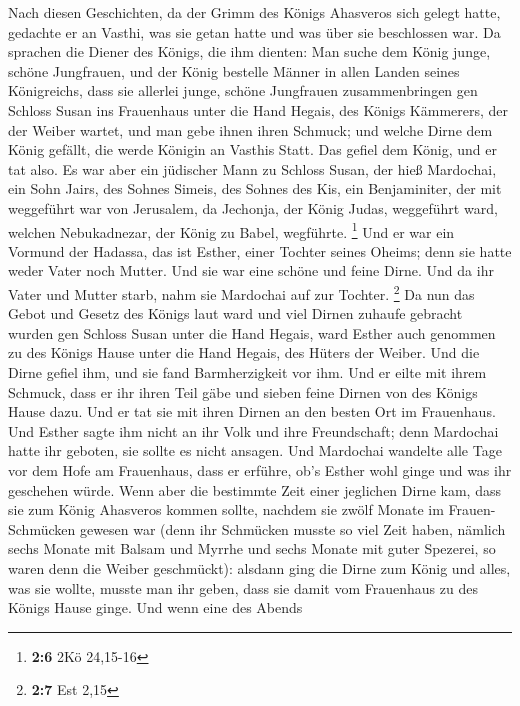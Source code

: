  Nach diesen Geschichten, da der Grimm des Königs
Ahasveros sich gelegt hatte, gedachte er an Vasthi, was sie getan hatte
und was über sie beschlossen war.  Da sprachen die Diener
des Königs, die ihm dienten: Man suche dem König junge, schöne
Jungfrauen,  und der König bestelle Männer in allen Landen
seines Königreichs, dass sie allerlei junge, schöne Jungfrauen
zusammenbringen gen Schloss Susan ins Frauenhaus unter die Hand Hegais,
des Königs Kämmerers, der der Weiber wartet, und man gebe ihnen ihren
Schmuck;  und welche Dirne dem König gefällt, die werde
Königin an Vasthis Statt. Das gefiel dem König, und er tat also.
 Es war aber ein jüdischer Mann zu Schloss Susan, der hieß
Mardochai, ein Sohn Jairs, des Sohnes Simeis, des Sohnes des Kis, ein
Benjaminiter,  der mit weggeführt war von Jerusalem, da
Jechonja, der König Judas, weggeführt ward, welchen Nebukadnezar, der
König zu Babel, wegführte. \footnote{\textbf{2:6} 2Kö 24,15-16}
 Und er war ein Vormund der Hadassa, das ist Esther, einer
Tochter seines Oheims; denn sie hatte weder Vater noch Mutter. Und sie
war eine schöne und feine Dirne. Und da ihr Vater und Mutter starb, nahm
sie Mardochai auf zur Tochter. \footnote{\textbf{2:7} Est 2,15}
 Da nun das Gebot und Gesetz des Königs laut ward und viel
Dirnen zuhaufe gebracht wurden gen Schloss Susan unter die Hand Hegais,
ward Esther auch genommen zu des Königs Hause unter die Hand Hegais, des
Hüters der Weiber.  Und die Dirne gefiel ihm, und sie fand
Barmherzigkeit vor ihm. Und er eilte mit ihrem Schmuck, dass er ihr
ihren Teil gäbe und sieben feine Dirnen von des Königs Hause dazu. Und
er tat sie mit ihren Dirnen an den besten Ort im Frauenhaus.
 Und Esther sagte ihm nicht an ihr Volk und ihre
Freundschaft; denn Mardochai hatte ihr geboten, sie sollte es nicht
ansagen.  Und Mardochai wandelte alle Tage vor dem Hofe
am Frauenhaus, dass er erführe, ob's Esther wohl ginge und was ihr
geschehen würde.  Wenn aber die bestimmte Zeit einer
jeglichen Dirne kam, dass sie zum König Ahasveros kommen sollte, nachdem
sie zwölf Monate im Frauen-Schmücken gewesen war (denn ihr Schmücken
musste so viel Zeit haben, nämlich sechs Monate mit Balsam und Myrrhe
und sechs Monate mit guter Spezerei, so waren denn die Weiber
geschmückt):  alsdann ging die Dirne zum König und alles,
was sie wollte, musste man ihr geben, dass sie damit vom Frauenhaus zu
des Königs Hause ginge.  Und wenn eine des Abends

